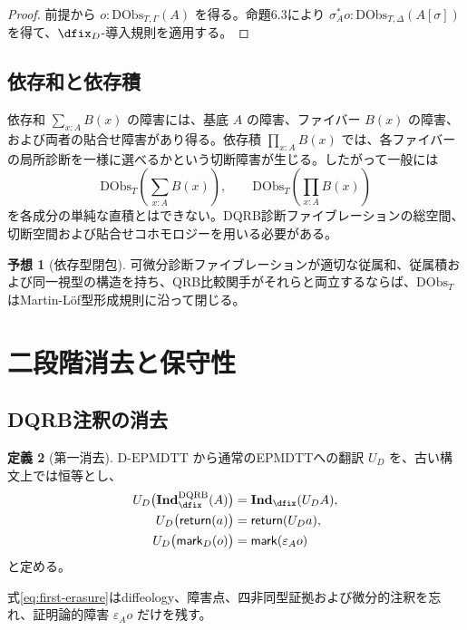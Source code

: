 \documentclass[a4paper,11pt]{ltjsarticle}
\theoremstyle{definition}
\newtheorem{definition}{定義}[section]
\newtheorem{conjecture}[definition]{予想}
\theoremstyle{plain}
\newcommand{\DEPMDTT}{\mathrm{D}\text{-}\mathrm{EPMDTT}}
\newcommand{\DQRB}{\mathrm{DQRB}}
\newcommand{\DObs}{\mathrm{DObs}}
\newcommand{\Ind}{\mathbf{Ind}_{\dfix}}
\newcommand{\DInd}{\mathbf{Ind}^{\DQRB}_{\dfix}}
\begin{document}
\begin{proof}
前提から $o:\DObs_{T,\Gamma}(A)$ を得る。命題6.3により $\sigma_A^*o:\DObs_{T,\Delta}(A[\sigma])$ を得て、$\dfix_D$-導入規則を適用する。
\end{proof}

\subsection{依存和と依存積}

依存和 $\sum_{x:A}B(x)$ の障害には、基底 $A$ の障害、ファイバー $B(x)$ の障害、および両者の貼合せ障害があり得る。依存積 $\prod_{x:A}B(x)$ では、各ファイバーの局所診断を一様に選べるかという切断障害が生じる。したがって一般には
\begin{equation}
 \DObs_T\left(\sum_{x:A}B(x)\right),
 \qquad
 \DObs_T\left(\prod_{x:A}B(x)\right)
\end{equation}
を各成分の単純な直積とはできない。DQRB診断ファイブレーションの総空間、切断空間および貼合せコホモロジーを用いる必要がある。

\begin{conjecture}[依存型閉包]
可微分診断ファイブレーションが適切な従属和、従属積および同一視型の構造を持ち、QRB比較関手がそれらと両立するならば、$\DObs_T$ はMartin-Löf型形成規則に沿って閉じる。
\end{conjecture}

\section{二段階消去と保守性}

\subsection{DQRB注釈の消去}

\begin{definition}[第一消去]
$\DEPMDTT$ から通常のEPMDTTへの翻訳 $U_D$ を、古い構文上では恒等とし、
\begin{align}
 U_D\bigl(\DInd(A)\bigr)&=\Ind(U_DA),\\
 U_D\bigl(\mathsf{return}(a)\bigr)
 &=\mathsf{return}(U_Da),\\
 U_D\bigl(\mathsf{mark}_D(o)\bigr)
 &=\mathsf{mark}(\varepsilon_Ao)
 \label{eq:first-erasure}
\end{align}
と定める。
\end{definition}

式\eqref{eq:first-erasure}はdiffeology、障害点、四非同型証拠および微分的注釈を忘れ、証明論的障害 $\varepsilon_Ao$ だけを残す。
\end{document}
